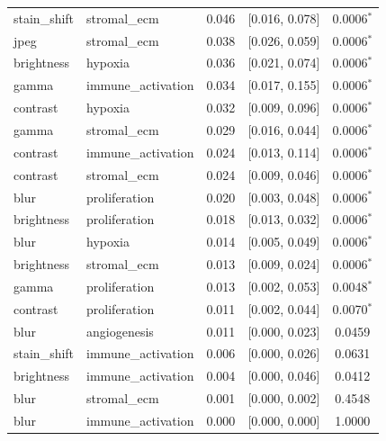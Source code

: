 \begin{table}[t]
\begin{tabular}{llccc}
stain\_shift & stromal\_ecm & 0.046 & [0.016, 0.078] & 0.0006$^{*}$ \\
jpeg & stromal\_ecm & 0.038 & [0.026, 0.059] & 0.0006$^{*}$ \\
brightness & hypoxia & 0.036 & [0.021, 0.074] & 0.0006$^{*}$ \\
gamma & immune\_activation & 0.034 & [0.017, 0.155] & 0.0006$^{*}$ \\
contrast & hypoxia & 0.032 & [0.009, 0.096] & 0.0006$^{*}$ \\
gamma & stromal\_ecm & 0.029 & [0.016, 0.044] & 0.0006$^{*}$ \\
contrast & immune\_activation & 0.024 & [0.013, 0.114] & 0.0006$^{*}$ \\
contrast & stromal\_ecm & 0.024 & [0.009, 0.046] & 0.0006$^{*}$ \\
blur & proliferation & 0.020 & [0.003, 0.048] & 0.0006$^{*}$ \\
brightness & proliferation & 0.018 & [0.013, 0.032] & 0.0006$^{*}$ \\
blur & hypoxia & 0.014 & [0.005, 0.049] & 0.0006$^{*}$ \\
brightness & stromal\_ecm & 0.013 & [0.009, 0.024] & 0.0006$^{*}$ \\
gamma & proliferation & 0.013 & [0.002, 0.053] & 0.0048$^{*}$ \\
contrast & proliferation & 0.011 & [0.002, 0.044] & 0.0070$^{*}$ \\
blur & angiogenesis & 0.011 & [0.000, 0.023] & 0.0459 \\
stain\_shift & immune\_activation & 0.006 & [0.000, 0.026] & 0.0631 \\
brightness & immune\_activation & 0.004 & [0.000, 0.046] & 0.0412 \\
blur & stromal\_ecm & 0.001 & [0.000, 0.002] & 0.4548 \\
blur & immune\_activation & 0.000 & [0.000, 0.000] & 1.0000 \\
\bottomrule
\end{tabular}
\end{table}
